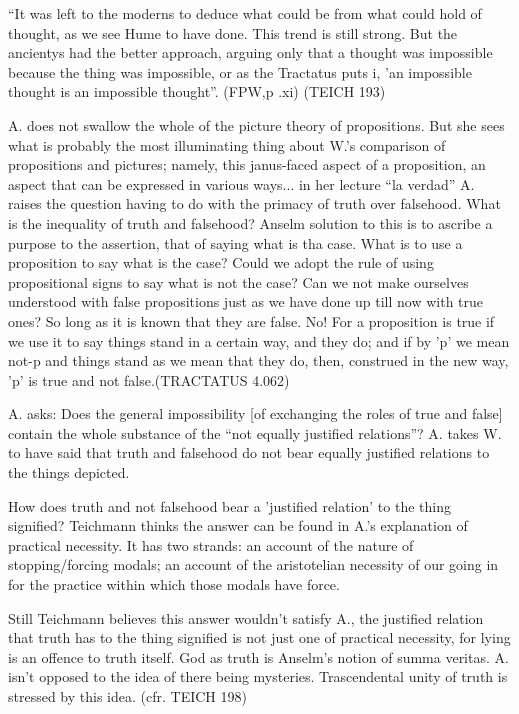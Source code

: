 \documentclass[../main.tex]{subfiles}
\begin{document}
``It was left to the moderns to deduce what could be from what could hold of thought, as we see Hume to have done. This trend is still strong. But the ancientys had the better approach, arguing only that a thought was impossible because the thing was impossible, or as the Tractatus puts i, 'an impossible thought is an impossible thought''. (FPW,p .xi) (TEICH 193)

A. does not swallow the whole of the picture theory of propositions. But she sees what is probably the most illuminating thing about W.'s comparison of propositions and pictures; namely, this janus-faced aspect of a proposition, an aspect that can be expressed in various ways... in her lecture ``la verdad'' A. raises the question having to do with the primacy of truth over falsehood. What is the inequality of truth and falsehood?
Anselm solution to this is to ascribe a purpose to the assertion, that of saying what is tha case. What is to use a proposition to say what is the case? Could we adopt the rule of using propositional signs to say what is not the case?
Can we not make ourselves understood with false propositions just as we have done up till now with true ones? So long as it is known that they are false. No! For a proposition is true if we use it to say things stand in a certain way, and they do; and if by 'p' we mean not-p  and things stand as we mean that they do, then, construed in the new way, 'p' is true and not false.(TRACTATUS 4.062)

A. asks: Does the general impossibility [of exchanging the roles of true and false] contain the whole substance of the ``not equally justified relations''? A. takes W. to have said that truth and falsehood do not bear equally justified relations to the things depicted. 

How does truth and not falsehood bear a 'justified relation' to the thing signified?
Teichmann thinks the answer can be found in A.'s explanation of practical necessity. It has two strands: an account of the nature of stopping/forcing modals; an account of the aristotelian necessity of our going in for the practice within which those modals have force.

Still Teichmann believes this answer wouldn't satisfy A., the justified relation that truth has to the thing signified is not just one of practical necessity, for lying is an offence to truth itself. God as truth is Anselm's notion of summa veritas. A. isn't opposed to the idea of there being mysteries. Trascendental unity of truth is stressed by this idea. (cfr. TEICH 198)
\end{document}
